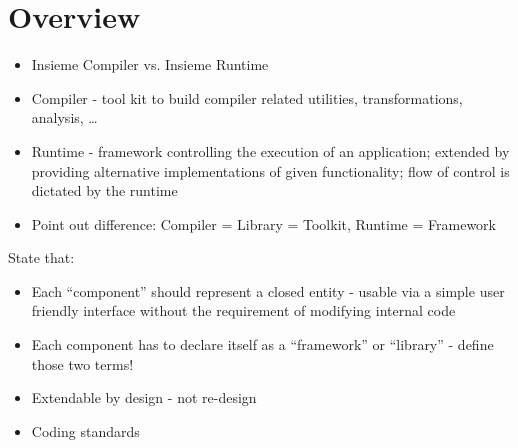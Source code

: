 \chapter{Overview} \label{cap:overview}

\begin{itemize}
  \item Insieme Compiler vs. Insieme Runtime
  \item Compiler - tool kit to build compiler related utilities,
  transformations, analysis, \ldots
  \item Runtime - framework controlling the execution of an application;
  extended by providing alternative implementations of given functionality; flow
  of control is dictated by the runtime
  \item Point out difference: Compiler = Library = Toolkit, Runtime = Framework
\end{itemize}


State that:
\begin{itemize}
  \item Each ``component'' should represent a closed entity - usable via a simple
  user friendly interface without the requirement of modifying internal code
  \item Each component has to declare itself as a ``framework'' or ``library'' -
  define those two terms!
  \item Extendable by design - not re-design
  \item Coding standards
\end{itemize}